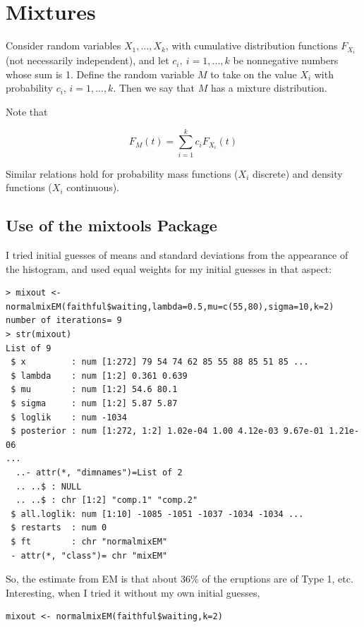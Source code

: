 \documentclass[11pt]{article}
\begin{document}
\section{Mixtures}

Consider random variables $X_1,...,X_k$, with cumulative distribution
functions $F_{X_i}$ (not necessarily independent), and let $c_i, ~
i=1,...,k$ be nonnegative numbers whose sum is 1.  Define the random
variable $M$ to take on the value $X_i$ with probability $c_i$,
$i=1,...,k$.  Then we say that $M$ has a mixture distribution.

Note that

\begin{equation}
F_{M}(t) = \sum_{i=1}^k c_i F_{X_i}(t)
\end{equation}

Similar relations hold for probability mass functions ($X_i$ discrete)
and density functions ($X_i$ continuous).

\subsection{Use of the mixtools Package}

I tried initial guesses of means and standard deviations from the
appearance of the histogram, and used equal weights for my initial
guesses in that aspect:

\begin{lstlisting}
> mixout <- normalmixEM(faithful$waiting,lambda=0.5,mu=c(55,80),sigma=10,k=2)
number of iterations= 9 
> str(mixout)
List of 9
 $ x         : num [1:272] 79 54 74 62 85 55 88 85 51 85 ...
 $ lambda    : num [1:2] 0.361 0.639
 $ mu        : num [1:2] 54.6 80.1
 $ sigma     : num [1:2] 5.87 5.87
 $ loglik    : num -1034
 $ posterior : num [1:272, 1:2] 1.02e-04 1.00 4.12e-03 9.67e-01 1.21e-06
...
  ..- attr(*, "dimnames")=List of 2
  .. ..$ : NULL
  .. ..$ : chr [1:2] "comp.1" "comp.2"
 $ all.loglik: num [1:10] -1085 -1051 -1037 -1034 -1034 ...
 $ restarts  : num 0
 $ ft        : chr "normalmixEM"
 - attr(*, "class")= chr "mixEM"
\end{lstlisting}

So, the estimate from EM is that about 36\% of the eruptions are of Type
1, etc.  Interesting, when I tried it without my own initial guesses,

\begin{lstlisting}
mixout <- normalmixEM(faithful$waiting,k=2)
\end{lstlisting}
\end{document}
